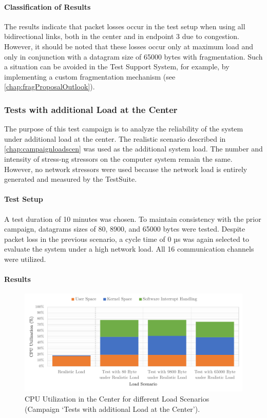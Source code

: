 \paragraph{Classification of Results}

The results indicate that packet losses occur in the test setup when using all bidirectional links, both in the center and in endpoint 3 due to congestion. However, it should be noted that these losses occur only at maximum load and only in conjunction with a datagram size of 65000 bytes with fragmentation. Such a situation can be avoided in the Test Support System, for example, by implementing a custom fragmentation mechanism (see \ref{chap:fragProposalOutlook}).

\subsubsection{Tests with additional Load at the Center}
The purpose of this test campaign is to analyze the reliability of the system under additional load at the center. The realistic scenario described in \ref{chap:campaignloadscen} was used as the additional system load. The number and intensity of stress-ng stressors on the computer system remain the same. However, no network stressors were used because the network load is entirely generated and measured by the TestSuite.

\paragraph{Test Setup}
A test duration of 10 minutes was chosen. To maintain consistency with the prior campaign, datagrams sizes of 80, 8900, and 65000 bytes were tested. Despite packet loss in the previous scenario, a cycle time of 0 µs was again selected to evaluate the system under a high network load. All 16 communication channels were utilized.

\paragraph{Results}

\begin{figure}[h]
    \centering
    \includegraphics[width=1\linewidth]{figures/reliability/ihawk/diagr7.pdf}
    \caption{CPU Utilization in the Center for different Load Scenarios (Campaign `Tests with additional Load at the Center').}
    \label{fig:diagr7CPU}
\end{figure}

